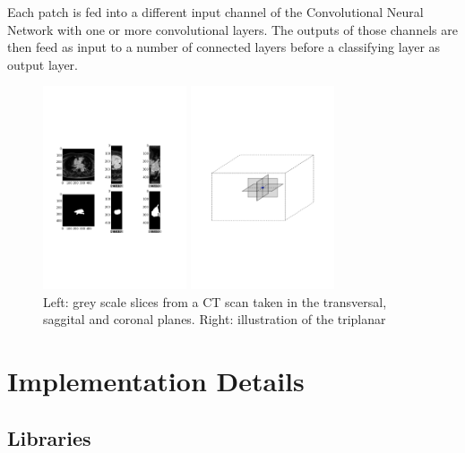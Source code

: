 Each patch is fed into a different input channel of the Convolutional Neural Network with one or more convolutional layers. The outputs of those channels are then feed as input to a number of connected layers before a classifying layer as output layer.

\begin{figure}
\centering
\begin{minipage}{0.45\textwidth}
\centering
\includegraphics[trim=2cm 8cm 2cm 8cm, clip=true, height=60mm]{Chapter3/example_slice.pdf}
\end{minipage}\hfill
\begin{minipage}{0.45\textwidth}
\centering
\includegraphics[trim=2cm 8cm 2cm 8cm, clip=true, height=60mm]{Chapter3/triplanar.pdf}
\end{minipage}
\caption{Left: grey scale slices from a CT scan taken in the transversal, saggital and coronal planes. Right: illustration of the triplanar}
\end{figure}

\section{Implementation Details}

\subsection{Libraries}

